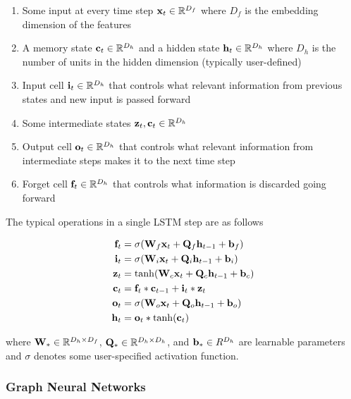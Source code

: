 \begin{enumerate}
	\item Some input at every time step $\mVector{x}_t \in \R^{D_f}$ where $D_f$ is the embedding dimension of the features
	\item A memory state $\mVector{c}_t \in \R^{D_h}$ and a hidden state $\mVector{h}_t \in \R^{D_h}$ where $D_h$ is the number of units in the hidden dimension (typically user-defined)
	\item Input cell $\mVector{i}_t \in \R^{D_h}$ that controls what relevant information from previous states and new input is passed forward
	\item Some intermediate states $\mVector{z}_t, \mVector{c}_t \in \R^{D_h}$
	\item Output cell $\mVector{o}_t \in \R^{D_h}$ that controls what relevant information from intermediate steps makes it to the next time step
	\item Forget cell $\mVector{f}_t \in \R^{D_h}$ that controls what information is discarded going forward
\end{enumerate}

The typical operations in a single LSTM step are as follows

\begin{align*}
\mVector{f}_t & = \sigma(\mVector{W}_f\mVector{x}_t + \mVector{Q}_f\mVector{h}_{t-1} + \mVector{b}_f) \\
\mVector{i}_t & = \sigma(\mVector{W}_i\mVector{x}_t + \mVector{Q}_i\mVector{h}_{t-1} + \mVector{b}_i) \\
\mVector{z}_t & = \tanh(\mVector{W}_c\mVector{x}_t + \mVector{Q}_c\mVector{h}_{t-1} + \mVector{b}_c) \\
\mVector{c}_t & = \mVector{f}_t * \mVector{c}_{t-1} + \mVector{i}_t * \mVector{z}_t \\
\mVector{o}_t & = \sigma(\mVector{W}_o\mVector{x}_t + \mVector{Q}_o\mVector{h}_{t-1} + \mVector{b}_o) \\
\mVector{h}_t & = \mVector{o}_t * \tanh(\mVector{c}_t)
\end{align*}

where $\mVector{W}_* \in \R^{D_h \times D_f}$, $\mVector{Q}_* \in \R^{D_h \times D_h}$, and $\mVector{b}_* \in R^{D_h}$ are learnable parameters and $\sigma$ denotes some user-specified activation function.

\subsubsection{Graph Neural Networks}

